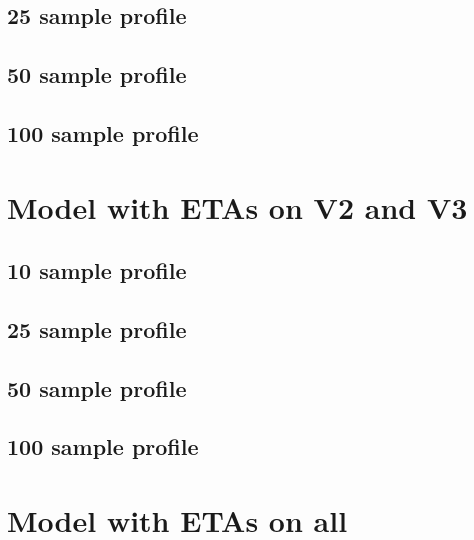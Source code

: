 \subsection{25 sample profile}


\subsection{50 sample profile}


\subsection{100 sample profile}



\section{Model with ETAs on V2 and V3}
\subsection{10 sample profile}


\subsection{25 sample profile}


\subsection{50 sample profile}


\subsection{100 sample profile}



\section{Model with ETAs on all}
